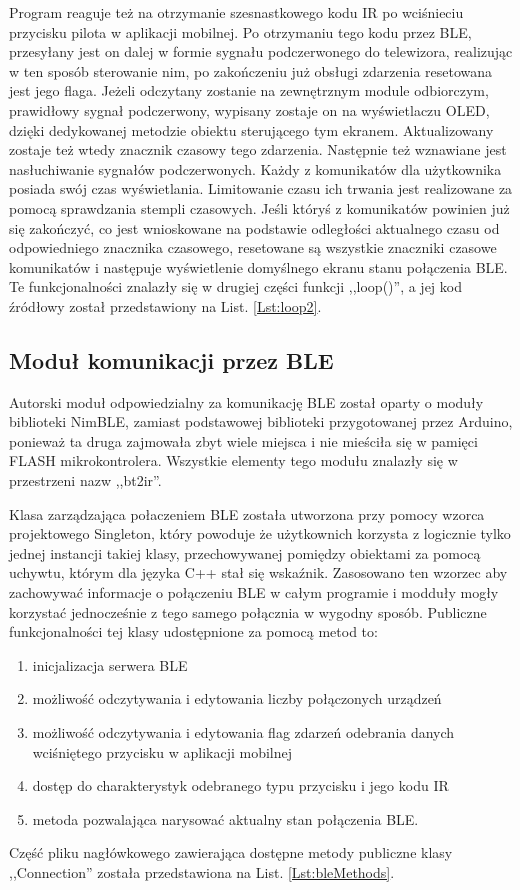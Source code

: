 \documentclass[12pt,twoside]{article}
\begin{document}
Program reaguje też na otrzymanie szesnastkowego kodu IR po wciśnieciu przycisku  pilota w aplikacji mobilnej. Po otrzymaniu tego kodu przez BLE, przesyłany jest on dalej w formie sygnału podczerwonego do telewizora, realizując w ten sposób sterowanie nim, po zakończeniu już obsługi zdarzenia resetowana jest jego flaga. Jeżeli odczytany zostanie na zewnętrznym module odbiorczym, prawidłowy sygnał podczerwony, wypisany zostaje on na wyświetlaczu OLED, dzięki dedykowanej metodzie obiektu sterującego tym ekranem. Aktualizowany zostaje też wtedy znacznik czasowy tego zdarzenia. Następnie też wznawiane jest nasłuchiwanie sygnałów podczerwonych. Każdy z komunikatów dla użytkownika posiada swój czas wyświetlania. Limitowanie czasu ich trwania jest realizowane za pomocą sprawdzania stempli czasowych. Jeśli któryś z komunikatów powinien już się zakończyć, co jest wnioskowane na podstawie odległości aktualnego czasu od odpowiedniego znacznika czasowego, resetowane są wszystkie znaczniki czasowe komunikatów i następuje wyświetlenie domyślnego ekranu stanu połączenia BLE. Te funkcjonalności znalazły się w drugiej części funkcji ,,loop()'', a jej kod źródłowy został przedstawiony na List. \ref{Lst:loop2}.

\subsection{Moduł komunikacji przez BLE}
Autorski moduł odpowiedzialny za komunikację BLE został oparty o moduły biblioteki NimBLE\cite{nimBLE}, zamiast podstawowej biblioteki przygotowanej przez Arduino, ponieważ ta druga zajmowała zbyt wiele miejsca i nie mieściła się w pamięci FLASH mikrokontrolera. Wszystkie elementy tego modułu znalazły się w przestrzeni nazw ,,bt2ir''.

Klasa zarządzająca połaczeniem BLE została utworzona przy pomocy wzorca projektowego Singleton\cite{designPatterns}, który powoduje że użytkownich korzysta z logicznie tylko jednej instancji takiej klasy, przechowywanej pomiędzy obiektami za pomocą uchywtu, którym dla języka C++ stał się wskaźnik. Zasosowano ten wzorzec aby zachowywać informacje o połączeniu BLE w całym programie i modduły mogły korzystać jednocześnie z tego samego połącznia w wygodny sposób. Publiczne funkcjonalności tej klasy udostępnione za pomocą metod to:
\begin{enumerate}[label=\alph*), leftmargin=1.25cm]
   \item inicjalizacja serwera BLE
   \item możliwość odczytywania i edytowania liczby połączonych urządzeń
   \item możliwość odczytywania i edytowania flag zdarzeń odebrania danych wciśniętego przycisku w aplikacji mobilnej
   \item dostęp do charakterystyk odebranego typu przycisku i jego kodu IR
   \item metoda pozwalająca narysować aktualny stan połączenia BLE.
\end{enumerate} Część pliku nagłówkowego zawierająca dostępne metody publiczne klasy ,,Connection'' została przedstawiona na List. \ref*{Lst:bleMethods}.
\end{document}
